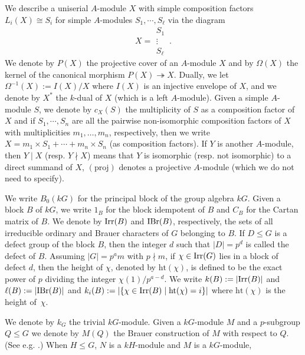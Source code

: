 \documentclass[12pt,a4paper]{amsart}
\theoremstyle{plain}\newtheorem{Theorem}{Theorem}[section]
\theoremstyle{plain}\newtheorem{Conjecture}[Theorem]{Conjecture}
\theoremstyle{plain}\newtheorem{Corollary}[Theorem]{Corollary}
\theoremstyle{plain}\newtheorem{Lemma}[Theorem]{Lemma}
\theoremstyle{plain}\newtheorem{Proposition}[Theorem]{Proposition}
\theoremstyle{definition}\newtheorem{Definition}[Theorem]{Definition}
\theoremstyle{definition}\newtheorem{Example}[Theorem]{Example}
\theoremstyle{definition}\newtheorem{Examples}[Theorem]{Examples}
\theoremstyle{definition}\newtheorem{Remark}[Theorem]{Remark}
\theoremstyle{definition}\newtheorem{Question}[Theorem]{Question}
\theoremstyle{definition}\newtheorem{Notation}[Theorem]{Notation}
\theoremstyle{definition}\newtheorem{Hypothesis}[Theorem]{Hypothesis}
\theoremstyle{definition}\newtheorem{Assumption}[Theorem]{Assumption}
\theoremstyle{definition}\newtheorem{Strategy}[Theorem]{Strategy}
\theoremstyle{definition}\newtheorem{Contents}[Theorem]{Contents}
\theoremstyle{definition}\newtheorem{Computations}[Theorem]{Computations}
\theoremstyle{definition}\newtheorem{Equivalences}[Theorem]{Equivalences}
\theoremstyle{definition}\newtheorem{Notation/Definition}[Theorem]{Notation/Definition}
\theoremstyle{definition}\newtheorem{noth}[Theorem]{}
\theoremstyle{plain}\newtheorem{Step}[Theorem]{Step}
\begin{document}
We describe a uniserial $A$-module $X$ with simple composition factors $L_i(X)\cong S_i$ 
for simple $A$-modules $S_1, \cdots, S_{\ell}$ via the diagram
$$X= {\boxed{ \begin{matrix}S_1\\ \vdots\\S_{\ell}\end{matrix}} \,.}$$
We denote by $P(X)$ the projective cover of an $A$-module $X$ and
by $\Omega(X)$ the kernel of the canonical morphism $P(X)\twoheadrightarrow X$. 
Dually, we let $\Omega^{-1}(X):=I(X)/X$ where $I(X)$ is an 
injective envelope 
of $X$,
and we denote by $X^*$ the $k$-dual of $X$ (which is a left $A$-module).
Given a simple $A$-module $S$, we denote by $c_X(S)$ 
the multiplicity of $S$ as a composition factor of $X$ and if $S_1, \cdots, S_n$ 
are all the pairwise non-isomorphic composition factors of $X$ 
with multiplicities $m_{1},\ldots,m_{n}$, respectively, then we write 
$X=m_1\times S_1+\cdots +m_n\times S_n$ (as composition factors).
If $Y$ is another $A$-module, then $Y\mid X$ (resp. $Y\nmid X$) means that $Y$ is 
isomorphic (resp. not isomorphic) to a direct summand of $X$, $({\mathrm{proj}})$ 
denotes a projective $A$-module (which we do not need to specify). 
\par
We write $B_0(kG)$ for the principal block of the group algebra $kG$. 
Given a  block $B$ of $kG$, we write $1_B$ for the block idempotent of $B$ and $C_B$ for 
the Cartan matrix of $B$.
We denote by $\mathrm{Irr}(B)$ and $\mathrm{IBr}(B)$, respectively, the sets of all
irreducible ordinary and Brauer characters of $G$ belonging to $B$.
If $D\leq G$ is a defect group of the block $B$, then the integer $d$ such that $|D|=p^{d}$ is called the defect of $B$.
Assuming $|G| = p^{a}m$ with $p\nmid m$, if $\chi\in\mathrm{Irr}(G)$ lies in a block of defect $d$, then 
the height of $\chi$, denoted by $\text{ht}(\chi)$, is defined to be the exact power of $p$ dividing the integer
$\chi(1)/ p^{a-d}$. 
We write $k(B):=|\mathrm{Irr}(B)|$ and $\ell(B):=|\mathrm{IBr}(B)|$ and 
$k_{i}(B):=|\{\chi\in\mathrm{Irr}(B)\mid \text{ht}(\chi)=i\}|$ where $\text{ht}(\chi)$ 
is the height of~$\chi$. 
\par
We denote by 
$k_G$ the trivial $kG$-module. Given a $kG$-module $M$ and 
a $p$-subgroup $Q\leq G$ we denote by 
$M(Q)$ the Brauer construction of $M$ with respect to $Q$. (See e.g. \cite[p. 219]{The95}.)
When $H\leq G$, $N$ is a $kH$-module and $M$ is a $kG$-module,
\end{document}
